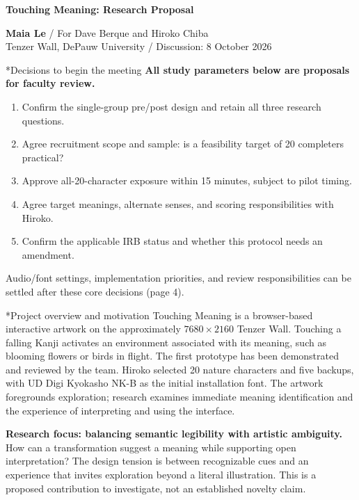 \documentclass[10pt,letterpaper]{article}
\makeatletter
\renewcommand\section{\@startsection{section}{1}{0pt}{8pt}{4pt}{\normalfont\large\bfseries}}
\makeatother
\begin{document}
{\Large\bfseries Touching Meaning: Research Proposal}\par
\textbf{Maia Le} / For Dave Berque and Hiroko Chiba\\
Tenzer Wall, DePauw University / Discussion: 8 October 2026

\section*{Decisions to begin the meeting}
\textbf{All study parameters below are proposals for faculty review.}
\begin{enumerate}
\item Confirm the single-group pre/post design and retain all three research questions.
\item Agree recruitment scope and sample: is a feasibility target of 20 completers practical?
\item Approve all-20-character exposure within 15 minutes, subject to pilot timing.
\item Agree target meanings, alternate senses, and scoring responsibilities with Hiroko.
\item Confirm the applicable IRB status and whether this protocol needs an amendment.
\end{enumerate}
Audio/font settings, implementation priorities, and review responsibilities can be settled after these core decisions (page 4).

\section*{Project overview and motivation}
Touching Meaning is a browser-based interactive artwork on the approximately $7680\times2160$ Tenzer Wall. Touching a falling Kanji activates an environment associated with its meaning, such as blooming flowers or birds in flight. The first prototype has been demonstrated and reviewed by the team. Hiroko selected 20 nature characters and five backups, with UD Digi Kyokasho NK-B as the initial installation font. The artwork foregrounds exploration; research examines immediate meaning identification and the experience of interpreting and using the interface.

\textbf{Research focus: balancing semantic legibility with artistic ambiguity.} How can a transformation suggest a meaning while supporting open interpretation? The design tension is between recognizable cues and an experience that invites exploration beyond a literal illustration. This is a proposed contribution to investigate, not an established novelty claim.
\end{document}
